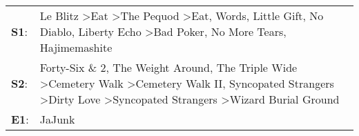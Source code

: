 \begin{supertabular}{p{0.03\textwidth}p{0.92\textwidth}}
 \textbf{S1}:  &     Le Blitz\textsuperscript{} \textgreater \enspace Eat\textsuperscript{} \textgreater \enspace The Pequod\textsuperscript{} \textgreater \enspace Eat\textsuperscript{}, \enspace Words\textsuperscript{}, \enspace Little Gift\textsuperscript{}, \enspace No Diablo\textsuperscript{}, \enspace Liberty Echo\textsuperscript{} \textgreater \enspace Bad Poker\textsuperscript{}, \enspace No More Tears\textsuperscript{}, \enspace Hajimemashite\textsuperscript{}  \enspace  \\
 \textbf{S2}:  &  Forty-Six \& 2\textsuperscript{}, \enspace The Weight Around\textsuperscript{}, \enspace The Triple Wide\textsuperscript{} \textgreater \enspace Cemetery Walk\textsuperscript{} \textgreater \enspace Cemetery Walk II\textsuperscript{}, \enspace Syncopated Strangers\textsuperscript{} \textgreater \enspace Dirty Love\textsuperscript{} \textgreater \enspace Syncopated Strangers\textsuperscript{} \textgreater \enspace Wizard Burial Ground\textsuperscript{}  \enspace  \\
 \textbf{E1}:  &                                                                                                                                                                                                                                                                                                                                                                                                                                                 JaJunk\textsuperscript{}  \enspace  \\
\end{supertabular}
